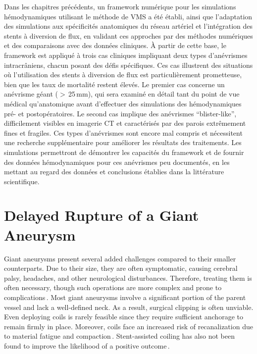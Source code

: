 \begin{tcolorbox}[abstract]
	Dans les chapitres précédents, un framework numérique pour les simulations hémodynamiques utilisant le méthode de VMS a été établi, ainsi que l'adaptation des simulations aux spécificités anatomiques du réseau artériel et l'intégration des stents à diversion de flux, en validant ces approches par des méthodes numériques et des comparaisons avec des données cliniques. À partir de cette base, le framework est appliqué à trois cas cliniques impliquant deux types d'anévrismes intracrâniens, chacun posant des défis spécifiques. Ces cas illustrent des situations où l'utilisation des stents à diversion de flux est particulièrement prometteuse, bien que les taux de mortalité restent élevés. Le premier cas concerne un anévrisme géant ($>$\,25\,mm), qui sera examiné en détail tant du point de vue médical qu'anatomique avant d'effectuer des simulations des hémodynamiques pré- et postopératoires. Le second cas implique des anévrismes ``blister-like'', difficilement visibles en imagerie CT et caractérisés par des parois extrêmement fines et fragiles. Ces types d'anévrismes sont encore mal compris et nécessitent une recherche supplémentaire pour améliorer les résultats des traitements. Les simulations permettront de démontrer les capacités du framework et de fournir des données hémodynamiques pour ces anévrismes peu documentés, en les mettant au regard des données et conclusions établies dans la littérature scientifique.

\end{tcolorbox}

\section{Delayed Rupture of a Giant Aneurysm}
Giant aneurysms present several added challenges compared to their smaller counterparts. Due to their size, they are often symptomatic, causing cerebral palsy, headaches, and other neurological disturbances. Therefore, treating them is often necessary, though such operations are more complex and prone to complications\,\cite{Rouchaud2016}. Most giant aneurysms involve a significant portion of the parent vessel and lack a well-defined neck. As a result, surgical clipping is often unviable. Even deploying coils is rarely feasible since they require sufficient anchorage to remain firmly in place. Moreover, coils face an increased risk of recanalization due to material fatigue and compaction\,\cite{Dandapat2021}. Stent-assisted coiling has also not been found to improve the likelihood of a positive outcome\,\cite{Hirato2023, Rouchaud2016}.

